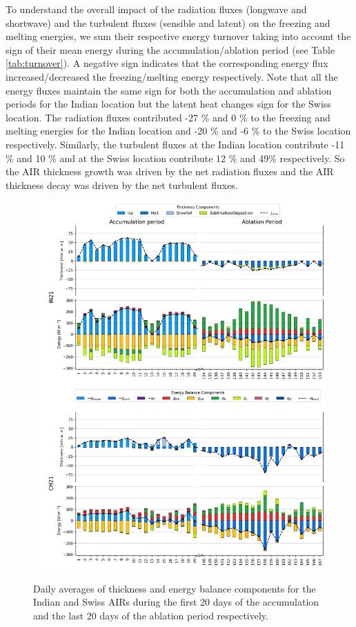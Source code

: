 \documentclass[utf8]{frontiersSCNS}
\begin{document}
To understand the overall impact of the radiation fluxes (longwave and shortwave) and the turbulent fluxes
(sensible and latent) on the freezing and melting energies, we sum their respective energy turnover taking into
account the sign of their mean energy during the accumulation/ablation period (see Table \ref{tab:turnover}). A
negative sign indicates that the corresponding energy flux increased/decreased the freezing/melting energy
respectively. Note that all the energy fluxes maintain the same sign for both the accumulation and ablation
periods for the Indian location but the latent heat changes sign for the Swiss location. The radiation fluxes
contributed -27 \% and 0 \% to the freezing and melting energies for the Indian location and -20 \% and -6 \%
to the Swiss location respectively.  Similarly, the turbulent fluxes at the Indian location contribute -11 \% and
10 \% and at the Swiss location contribute 12 \% and 49\%  respectively. So the AIR thickness growth was
driven by the net radiation fluxes and the AIR thickness decay was driven by the net turbulent fluxes.

\begin{figure}
	\begin{center}
		\includegraphics[width=\linewidth]{Figures/Figure_7.jpg} \end{center}
	\caption{Daily averages of thickness and energy balance components for the Indian and Swiss AIRs during the
		first 20 days of the accumulation and the last 20 days of the ablation period respectively.  } \label{fig:MEB}
\end{figure}
\end{document}
